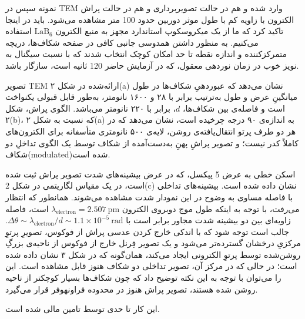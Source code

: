 \documentclass{article}
\begin{document}
نمونه سپس در TEM وارد شده و هم در حالت تصویربرداری و هم در حالت پراش الکترون با زاویه کم با طول موثر دوربین حدود 100 متر مشاهده می‌شود. باید در اینجا تاکید کرد که ما از یک میکروسکوپ استاندارد  مجهز به منبع الکترون $\text{LaB}_6$ استفاده می‌کنیم. به منظور داشتن همدوسی جانبی کافی در صفحه شکاف‌ها، دریچه متمرکزکننده و اندازه نقطه تا حد امکان کوچک انتخاب شدند که با نسبت سیگنال به نویز خوب در زمان نوردهی معقول، که در آزمایش حاضر 120 ثانیه است، سازگار باشد.

تصویر TEM ارائه‌شده در شکل ۲(a) نشان می‌دهد که عبوردهیِ شکاف‌ها در طول میانگینِ عرض و طول به‌ترتیب برابر با ۲۸ و ۱۶۰۰ نانومتر، به‌طور قابل قبولی یکنواخت است و فاصله‌ی بین شکاف‌ها، $d$، برابر با ۲۲۰ نانومتر می‌باشد. الگوی پراش، شکل ۲(b)، که نسبت به شکل ۲(a) به اندازه‌ی ۹۰ درجه چرخیده است، نشان می‌دهد که در هر دو طرف پرتو انتقال‌یافته‌ی روشن،
لایه‌ی ۵۰۰ نانومتر‌ی متأسفانه برای الکترون‌های  کاملاً کدر نیست؛ و تصویر پراشِ پهنِ به‌دست‌آمده از شکاف توسط یک الگوی تداخلِ دو شکاف(modulated)شده است.

اسکن خطی به عرض 5 پیکسل، که در عرض بیشینه‌های شدت تصویر پراش ثبت شده است، در یک مقیاس لگاریتمی در شکل 2(c) نشان داده شده است. بیشینه‌های تداخلی با فاصله مساوی به وضوح در این نمودار شدت مشاهده می‌شوند. همانطور که انتظار می‌رفت، با توجه به اینکه طول موج دوبروی الکترون $\lambda_{\text{electron}} = 2.507\ \text{pm}$ است، فاصله زاویه‌ای بین دو بیشینه شدت مجاور برابر است با $\Delta\theta \sim \lambda_{\text{electron}}/d \sim 1.1 \times 10^{-5}\ \text{rad}$.
جالب است توجه شود که با اندکی خارج کردن عدسی پراش از فوکوس، تصویرِ پرتوِ مرکزیِ درخشان گسترده‌تر می‌شود و یک تصویر فِرنل خارج از فوکوس از ناحیه‌ی بزرگِ روشن‌شده توسط پرتوِ الکترونی ایجاد می‌کند، همان‌گونه که در شکل ۳ نشان داده شده است؛ در حالی که در مرکز آن، تصویر تداخلی دو شکاف هنوز قابل مشاهده است. این را می‌توان با توجه به این نکته توضیح داد که چون شکاف‌ها بسیار کوچکتر از ناحیه روشن شده هستند، تصویر پراش هنوز در محدوده فراونهوفر قرار می‌گیرد.

\vspace{1em}
\noindent
این کار تا حدی توسط  تامین مالی شده است.
\end{document}
